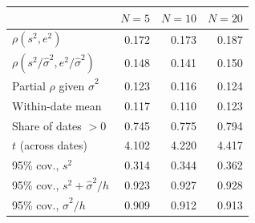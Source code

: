 \begin{tabular}{lrrr}
\toprule
 & $N=5$ & $N=10$ & $N=20$ \\
\midrule
$\rho(s^2, e^2)$ & 0.172 & 0.173 & 0.187 \\
$\rho(s^2/\hat\sigma^2, e^2/\hat\sigma^2)$ & 0.148 & 0.141 & 0.150 \\
Partial $\rho$ given $\hat\sigma^2$ & 0.123 & 0.116 & 0.124 \\
Within-date mean & 0.117 & 0.110 & 0.123 \\
Share of dates $>0$ & 0.745 & 0.775 & 0.794 \\
$t$ (across dates) & 4.102 & 4.220 & 4.417 \\
\midrule
95\% cov., $s^2$ & 0.314 & 0.344 & 0.362 \\
95\% cov., $s^2+\hat\sigma^2/h$ & 0.923 & 0.927 & 0.928 \\
95\% cov., $\hat\sigma^2/h$ & 0.909 & 0.912 & 0.913 \\
\bottomrule
\end{tabular}

